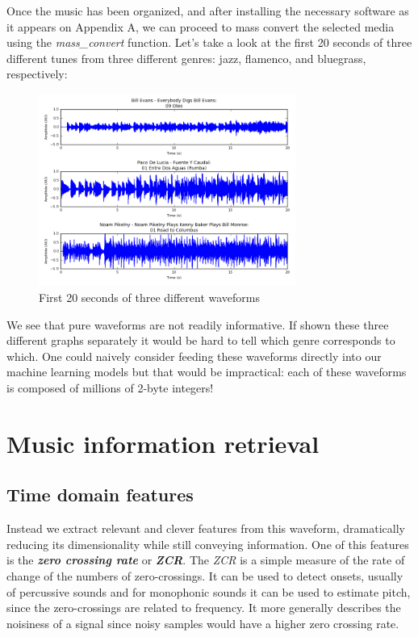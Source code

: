 \documentclass[12pt]{article}
\begin{document}
\medskip

Once the music has been organized, and after installing the necessary software as it appears on Appendix A, we can proceed to mass convert the selected media using the \textit{mass\_convert} function. Let's take a look at the first 20 seconds of three different tunes from three different genres: jazz, flamenco, and bluegrass, respectively:

\begin{figure}
\centering
  \includegraphics[width=0.75\textwidth]{waveforms.png}
  \caption{First 20 seconds of three different waveforms}
  \label{waveforms}
\end{figure}

\newpage

We see that pure waveforms are not readily informative. If shown these three different graphs separately it would be hard to tell which genre corresponds to which. One could naively consider feeding these waveforms directly into our machine learning models but that would be impractical: each of these waveforms is composed of millions of 2-byte integers!
\medskip

\section*{Music information retrieval}
\subsection*{Time domain features}
Instead we extract relevant and clever features from this waveform, dramatically reducing its dimensionality while still conveying information. One of this features is the \textbf{\textit{zero crossing rate}} or \textbf{\textit{ZCR}}. The \textit{ZCR} is a simple measure of the rate of change of the numbers of zero-crossings. It can be used to detect onsets, usually of percussive sounds and for monophonic sounds it can be used to estimate pitch, since the zero-crossings are related to frequency. It more generally describes the noisiness of a signal since noisy samples would have a higher zero crossing rate. 
\medskip
\end{document}
